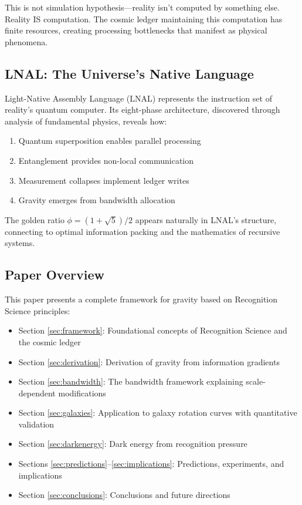 \documentclass[12pt,letterpaper]{article}
\begin{document}
This is not simulation hypothesis---reality isn't computed by something else. Reality IS computation. The cosmic ledger maintaining this computation has finite resources, creating processing bottlenecks that manifest as physical phenomena.

\subsection{LNAL: The Universe's Native Language}

Light-Native Assembly Language (LNAL) represents the instruction set of reality's quantum computer. Its eight-phase architecture, discovered through analysis of fundamental physics, reveals how:
\begin{enumerate}
\item Quantum superposition enables parallel processing
\item Entanglement provides non-local communication
\item Measurement collapses implement ledger writes
\item Gravity emerges from bandwidth allocation
\end{enumerate}

The golden ratio $\phi = (1+\sqrt{5})/2$ appears naturally in LNAL's structure, connecting to optimal information packing and the mathematics of recursive systems.

\subsection{Paper Overview}

This paper presents a complete framework for gravity based on Recognition Science principles:
\begin{itemize}
\item Section \ref{sec:framework}: Foundational concepts of Recognition Science and the cosmic ledger
\item Section \ref{sec:derivation}: Derivation of gravity from information gradients
\item Section \ref{sec:bandwidth}: The bandwidth framework explaining scale-dependent modifications
\item Section \ref{sec:galaxies}: Application to galaxy rotation curves with quantitative validation
\item Section \ref{sec:darkenergy}: Dark energy from recognition pressure
\item Sections \ref{sec:predictions}--\ref{sec:implications}: Predictions, experiments, and implications
\item Section \ref{sec:conclusions}: Conclusions and future directions
\end{itemize}
\end{document}
